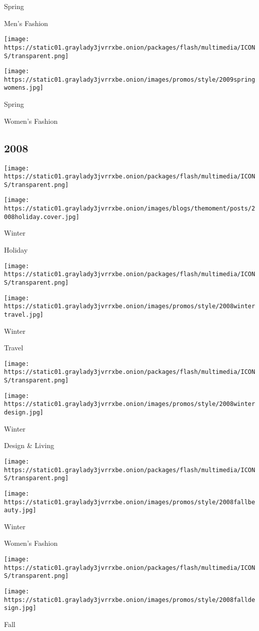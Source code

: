 Spring

Men's Fashion

\texttt{[image: https://static01.graylady3jvrrxbe.onion/packages/flash/multimedia/ICONS/transparent.png]}

\texttt{[image: https://static01.graylady3jvrrxbe.onion/images/promos/style/2009springwomens.jpg]}

Spring

Women's Fashion

\hypertarget{2008}{%
\subsection{2008}\label{2008}}

\texttt{[image: https://static01.graylady3jvrrxbe.onion/packages/flash/multimedia/ICONS/transparent.png]}

\texttt{[image: https://static01.graylady3jvrrxbe.onion/images/blogs/themoment/posts/2008holiday.cover.jpg]}

Winter

Holiday

\texttt{[image: https://static01.graylady3jvrrxbe.onion/packages/flash/multimedia/ICONS/transparent.png]}

\texttt{[image: https://static01.graylady3jvrrxbe.onion/images/promos/style/2008wintertravel.jpg]}

Winter

Travel

\texttt{[image: https://static01.graylady3jvrrxbe.onion/packages/flash/multimedia/ICONS/transparent.png]}

\texttt{[image: https://static01.graylady3jvrrxbe.onion/images/promos/style/2008winterdesign.jpg]}

Winter

Design \& Living

\texttt{[image: https://static01.graylady3jvrrxbe.onion/packages/flash/multimedia/ICONS/transparent.png]}

\texttt{[image: https://static01.graylady3jvrrxbe.onion/images/promos/style/2008fallbeauty.jpg]}

Winter

Women's Fashion

\texttt{[image: https://static01.graylady3jvrrxbe.onion/packages/flash/multimedia/ICONS/transparent.png]}

\texttt{[image: https://static01.graylady3jvrrxbe.onion/images/promos/style/2008falldesign.jpg]}

Fall

